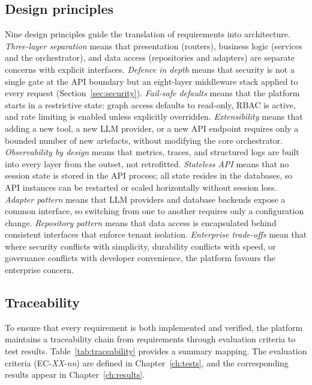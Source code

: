 \documentclass[a4paper,noexaminfo]{sapthesis}
\begin{document}
\subsection{Design principles}

Nine design principles guide the translation of requirements into
architecture.  \emph{Three-layer separation} means that presentation
(routers), business logic (services and the orchestrator), and data access
(repositories and adapters) are separate concerns with explicit interfaces.
\emph{Defence in depth} means that security is not a single gate at the API
boundary but an eight-layer middleware stack applied to every request
(Section~\ref{sec:security}).  \emph{Fail-safe defaults} means that the
platform starts in a restrictive state: graph access defaults to read-only, RBAC is
active, and rate limiting is enabled unless explicitly overridden.
\emph{Extensibility} means that adding a new tool, a new LLM provider, or
a new API endpoint requires only a bounded number of new artefacts, without
modifying the core orchestrator.  \emph{Observability by design} means that
metrics, traces, and structured logs are built into every layer from the
outset, not retrofitted.  \emph{Stateless API} means that no session state
is stored in the API process; all state resides in the databases, so API
instances can be restarted or scaled horizontally without session loss.
\emph{Adapter pattern} means that LLM providers and database backends
expose a common interface, so switching from one to another requires only a
configuration change.  \emph{Repository pattern} means that data access is
encapsulated behind consistent interfaces that enforce tenant isolation.
\emph{Enterprise trade-offs} mean that where security conflicts with
simplicity, durability conflicts with speed, or governance conflicts with
developer convenience, the platform favours the enterprise concern.

\subsection{Traceability}

To ensure that every requirement is both implemented and verified, the
platform maintains a traceability chain from requirements through
evaluation criteria to test results.  Table~\ref{tab:traceability} provides
a summary mapping.  The evaluation criteria (EC-\emph{XX}-\emph{nn}) are
defined in Chapter~\ref{ch:tests}, and the corresponding results appear in
Chapter~\ref{ch:results}.
\end{document}
